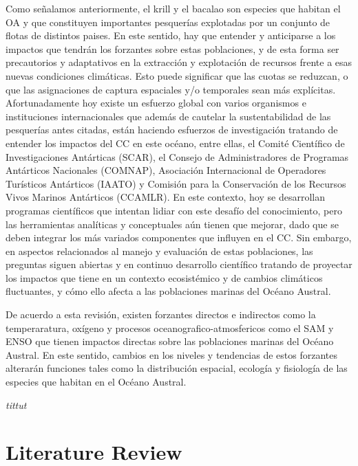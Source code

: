 \documentclass{sydneythesis}
\begin{document}
Como señalamos anteriormente, el krill y el bacalao son especies que habitan el OA y que constituyen importantes pesquerías explotadas por un conjunto de flotas de distintos paises. En este sentido, hay que entender y anticiparse a los impactos que tendrán los forzantes sobre estas poblaciones, y de esta forma ser precautorios y adaptativos en la extracción y explotación de recursos frente a esas nuevas condiciones climáticas. Esto puede significar que las cuotas se reduzcan, o que las asignaciones de captura espaciales y/o temporales sean más explícitas. Afortunadamente hoy existe un esfuerzo global con varios organismos e instituciones internacionales que además de cautelar la sustentabilidad de las pesquerías antes citadas, están haciendo esfuerzos de investigación tratando de entender los impactos del CC en este océano, entre ellas, el Comité Científico de Investigaciones Antárticas (SCAR), el Consejo de Administradores de Programas Antárticos Nacionales (COMNAP), Asociación Internacional de Operadores Turísticos Antárticos (IAATO) y Comisión para la Conservación de los Recursos Vivos Marinos Antárticos (CCAMLR). En este contexto, hoy se desarrollan programas científicos que intentan lidiar con este desafío del conocimiento, pero las herramientas analíticas y conceptuales aún tienen que mejorar, dado que se deben integrar los más variados componentes que influyen en el CC. Sin embargo, en aspectos relacionados al manejo y evaluación de estas poblaciones, las preguntas siguen abiertas y en continuo desarrollo científico tratando de proyectar los impactos que tiene en un contexto ecosistémico y de cambios climáticos fluctuantes, y cómo ello afecta a las poblaciones marinas del Océano Austral.

De acuerdo a esta revisión, existen forzantes directos e indirectos como la temperaratura, oxígeno y procesos oceanografico-atmosfericos como el SAM y ENSO que tienen impactos directas sobre las poblaciones marinas del Océano Austral. En este sentido, cambios en los niveles y tendencias de estos forzantes alterarán funciones tales como la distribución espacial, ecología y fisiología de las especies que habitan en el Océano Austral.

\newpage

\emph{tittut}

\hypertarget{ch:litreview}{%
\chapter{Literature Review}\label{ch:litreview}}
\end{document}
